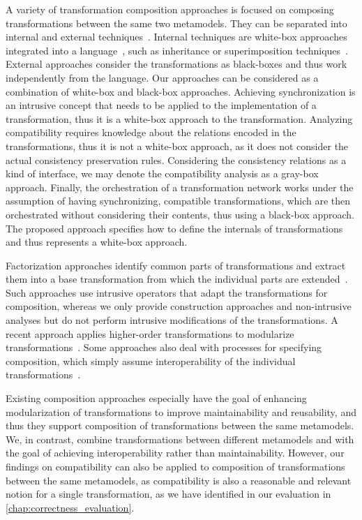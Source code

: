 A variety of transformation composition approaches is focused on composing transformations between the same two metamodels.
They can be separated into internal and external techniques~\cite{wagelaar2008a}.
Internal techniques are white-box approaches integrated into a language~\cite{wagelaar2011a}, such as inheritance or superimposition techniques~\cite{wagelaar2010a}.
External approaches consider the transformations as black-boxes and thus work independently from the language. 
Our approaches can be considered as a combination of white-box and black-box approaches.
Achieving synchronization is an intrusive concept that needs to be applied to the implementation of a transformation, thus it is a white-box approach to the transformation.
Analyzing compatibility requires knowledge about the relations encoded in the transformations, thus it is not a white-box approach, as it does not consider the actual consistency preservation rules. Considering the consistency relations as a kind of interface, we may denote the compatibility analysis as a gray-box approach.
Finally, the orchestration of a transformation network works under the assumption of having synchronizing, compatible transformations, which are then orchestrated without considering their contents, thus using a black-box approach.
The proposed \commonalities approach specifies how to define the internals of transformations and thus represents a white-box approach.

Factorization approaches identify common parts of transformations and extract them into a base transformation from which the individual parts are extended~\cite{cuadrado2008a}.
Such approaches use intrusive operators that adapt the transformations for composition, whereas we only provide construction approaches and non-intrusive analyses but do not perform intrusive modifications of the transformations.
A recent approach applies higher-order transformations to modularize transformations~\cite{fleck2017transformationModularization-TSE}.
Some approaches also deal with processes for specifying composition, which simply assume interoperability of the individual transformations~\cite{oldevik2005a}.

Existing composition approaches especially have the goal of enhancing modularization of transformations to improve maintainability and reusability, and thus they support composition of transformations between the same metamodels. 
We, in contrast, combine transformations between different metamodels and with the goal of achieving interoperability rather than maintainability.
However, our findings on compatibility can also be applied to composition of transformations between the same metamodels, as compatibility is also a reasonable and relevant notion for a single transformation, as we have identified in our evaluation in \autoref{chap:correctness_evaluation}.



